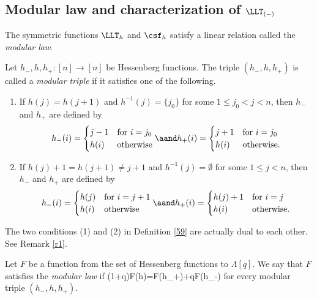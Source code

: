 \subsection{Modular law and characterization of \texorpdfstring{$\LLT_{(-)}$}{LLT(-)}}

The symmetric functions $\LLT_h$ and $\csf_h$ satisfy a linear relation called the \emph{modular law}.
\begin{definition} \label{59} Let $h_-,h,h_+:[n]\to[n]$ be Hessenberg functions.
	The triple $(h_-,h,h_+)$ is called a \emph{modular triple} if it satisfies one of the following. 
		\begin{enumerate}
			\item If $h(j)=h(j+1)$ and $h^{-1}(j)=\{j_0\}$ for some $1\leq j_0<j<n$, then $h_-$ and $h_+$ are defined by 
			\[h_-(i)=\begin{cases}
				j-1 & \text{for }i=j_0\\
				h(i) &\text{otherwise}
				\end{cases}
			\aand h_+(i)=\begin{cases}
				j+1 &\text{for }i=j_0\\
				h(i) & \text{otherwise.}
				\end{cases} 
			\]
			\item If $h(j)+1=h(j+1)\neq j+1$ and $h^{-1}(j)=\emptyset$ for some $1\leq j<n$, then $h_-$ and $h_+$ are defined by 
			\[h_-(i)=\begin{cases}
				h(j) &\text{for }i=j+1\\
				h(i) &\text{otherwise}
				\end{cases}  
			\aand h_+(i)=\begin{cases}
				h(j)+1 &\text{for }i= j\\
				h(i) &\text{otherwise.}
				\end{cases}
			\]
		\end{enumerate}
\end{definition}

The two conditions (1) and (2) in Definition \ref{59} are actually dual to each other. See Remark \ref{r1}. 

\begin{definition} \label{n42}
Let $F$ be a function from the set of Hessenberg functions to $\Lambda[q]$. We say that $F$ satisfies the \emph{modular law} if
	\beq \label{5} (1+q)F(h)=F(h_+)+qF(h_-)\eeq
	for every modular triple $(h_-,h,h_+)$. 
\end{definition}

